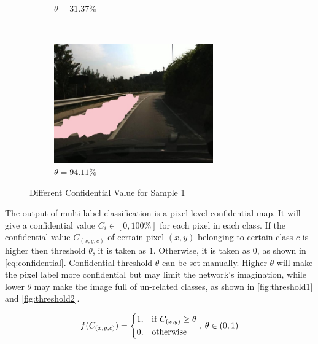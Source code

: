 \begin{spacing}{1.5}
\begin{figure}[!ht]
\begin{subfigure}[b]{0.49\textwidth}
        \caption{$\theta = 31.37\%$}
    \end{subfigure}%
    ~
    \begin{subfigure}[b]{0.49\textwidth}
        \centering
        \includegraphics[width=2.7in, fbox]{Chapter5/pic1conf99.png}
        \caption{$\theta = 94.11\%$}
    \end{subfigure}
    \caption{Different Confidential Value for Sample 1}
    \label{fig:threshold1}
\end{figure}


The output of multi-label classification is a pixel-level confidential map. It will give a confidential value $C_i \in [0,100\%]$ for each pixel in each class. If the confidential value $C_{(x,y,c)}$ of certain pixel $(x,y)$ belonging to certain class $c$ is higher then threshold $\theta$, it is taken as $1$. Otherwise, it is taken as $0$, as shown in \autoref{eq:confidential}. Confidential threshold $\theta$ can be set manually. Higher $\theta$ will make the pixel label more confidential but may limit the network's imagination, while lower $\theta$ may make the image full of un-related classes, as shown in \autoref{fig:threshold1} and \autoref{fig:threshold2}.

\begin{equation}
\label{eq:confidential}
    f(C_{(x,y,c)})= 
    \begin{dcases}
        1, & \text{if } C_{(x,y)} \geq \theta\\
        0, & \text{otherwise}
    \end{dcases},\; \theta \in (0,1) 
\end{equation}


\end{spacing}
